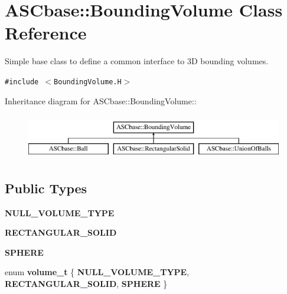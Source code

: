 \section{ASCbase::Bounding\-Volume Class Reference}
\label{classASCbase_1_1BoundingVolume}
Simple base class to define a common interface to 3D bounding volumes.  


{\tt \#include $<$Bounding\-Volume.H$>$}

Inheritance diagram for ASCbase::Bounding\-Volume::\begin{figure}[H]
\begin{center}
\leavevmode
\includegraphics[height=2cm]{classASCbase_1_1BoundingVolume}
\end{center}
\end{figure}
\subsection*{Public Types}
\begin{CompactItemize}
\item 
\textbf{NULL\_\-VOLUME\_\-TYPE}\label{classASCbase_1_1BoundingVolume_90dd526306d995889c2ba0527d0e400c206c9d67d4ddcabdc42058538e90f223}

\item 
\textbf{RECTANGULAR\_\-SOLID}\label{classASCbase_1_1BoundingVolume_90dd526306d995889c2ba0527d0e400c978442c972efd3f68accee6a0a9f172c}

\item 
\textbf{SPHERE}\label{classASCbase_1_1BoundingVolume_90dd526306d995889c2ba0527d0e400cc10cb5a6a2c07cc74764081b2c34829d}

\item 
enum \textbf{volume\_\-t} \{ \textbf{NULL\_\-VOLUME\_\-TYPE}, 
\textbf{RECTANGULAR\_\-SOLID}, 
\textbf{SPHERE}
 \}
\end{CompactItemize}
